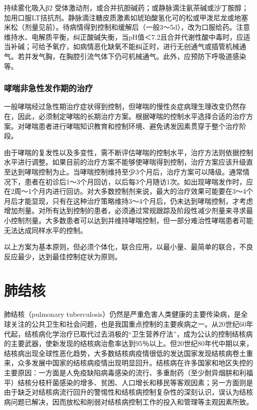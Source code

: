 持续雾化吸入β{2}
受体激动剂，或合并抗胆碱药；或静脉滴注氨茶碱或沙丁胺醇；加用口服LT拮抗剂。静脉滴注糖皮质激素如琥珀酸氢化可的松或甲泼尼龙或地塞米松（剂量见前）。待病情得到控制和缓解后（一般3～5d），改为口服给药。注意维持水、电解质平衡，纠正酸碱失衡，当pH值＜7.2且合并代谢性酸中毒时，应适当补碱；可给予氧疗，如病情恶化缺氧不能纠正时，进行无创通气或插管机械通气。若并发气胸，在胸腔引流气体下仍可机械通气。此外，应预防下呼吸道感染等。

\subsubsection{哮喘非急性发作期的治疗}

一般哮喘经过急性期治疗症状得到控制，但哮喘的慢性炎症病理生理改变仍然存在，因此，必须制定哮喘的长期治疗方案。根据哮喘的控制水平选择合适的治疗方案。对哮喘患者进行哮喘知识教育和控制环境、避免诱发因素贯穿于整个治疗阶段。

由于哮喘的复发性以及多变性，需不断评估哮喘的控制水平，治疗方法则依据控制水平进行调整。如果目前的治疗方案不能够使哮喘得到控制，治疗方案应该升级直至达到哮喘控制为止。当哮喘控制维持至少3个月后，治疗方案可以降级。通常情况下，患者在初诊后1～3个月回访，以后每3个月随访1次。如出现哮喘发作时，应在2周～1个月内进行回访。对大多数控制剂来说，最大的治疗效果可能要在3～4个月后才能显现，只有在这种治疗策略维持3～4个月后，仍未达到哮喘控制，才考虑增加剂量。对所有达到控制的患者，必须通过常规跟踪及阶段性减少剂量来寻求最小控制剂量。大多数患者可以达到并维持哮喘控制，但一部分难治性哮喘患者可能无法达成同样水平的控制。

以上方案为基本原则，但必须个体化，联合应用，以最小量、最简单的联合，不良反应最少，达到最佳控制症状为原则。

\section{肺结核}

肺结核（pulmonary
tuberculosis）仍然是严重危害人类健康的主要传染病，是全球关注的公共卫生和社会问题，也是我国重点控制的主要疾病之一。从20世纪60年代起，结核病化学治疗已取代过去消极的“卫生营养疗法”，成为公认的控制结核病的主要武器，使新发现的结核病治愈率达到95％以上。但20世纪80年代中期以来，结核病出现全球性恶化趋势，大多数结核病疫情很低的发达国家发现结核病卷土重来，众多发展中国家的结核病疫情出现明显回升。结核病在许多国家和地区失控的主要原因：一方面是人免疫缺陷病毒感染的流行、多重耐药（至少耐异烟肼和利福平）结核分枝杆菌感染的增多、贫困、人口增长和移民等客观因素；另一方面则是由于缺乏对结核病流行回升的警惕性和结核病控制复杂性的深刻认识，误认为结核病问题已解决，因而放松和削弱对结核病控制工作的投入和管理等主观因素所致。

